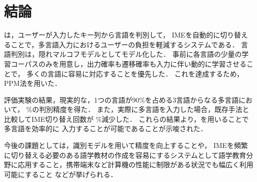 \documentclass[japanese]{jnlp_1.4}
\newcommand{\name}{}
\renewcommand{\text}{}
\newcommand{\accuracy}{}
\newcommand{\decreaserate}{}
\begin{document}
\section{結論}

{\name}は，ユーザーが入力したキー列から言語を判別して，
IMEを自動的に切り替えることで，多言語入力におけるユーザーの負担を軽減するシステムである．
言語判別は，隠れマルコフモデルとしてモデル化した．
事前に各言語の少量の学習コーパスのみを用意し，出力確率も遷移確率も入力に伴い動的に学習させることで，
多くの言語に容易に対応することを優先した．
これを達成するため，PPM法を用いた．

評価実験の結果，現実的な，1つの言語が90\%を占める3言語からなる多言語{\text}において，
\accuracy\%の判別精度を得た．
また，実際に多言語{\text}を入力した場合，既存手法と比較してIME切り替え回数が
\decreaserate\%減少した．
これらの結果より，{\name}を用いることで多言語{\text}を効率的に
入力することが可能であることが示唆された．

今後の課題としては，識別モデルを用いて精度を向上することや，
IMEを頻繁に切り替える必要のある語学教材の作成を容易にするシステムとして語学教育分野に応用すること，携帯端末など計算機の性能に制限がある状況でも幅広く利用可能にすること
などが挙げられる．
\end{document}
